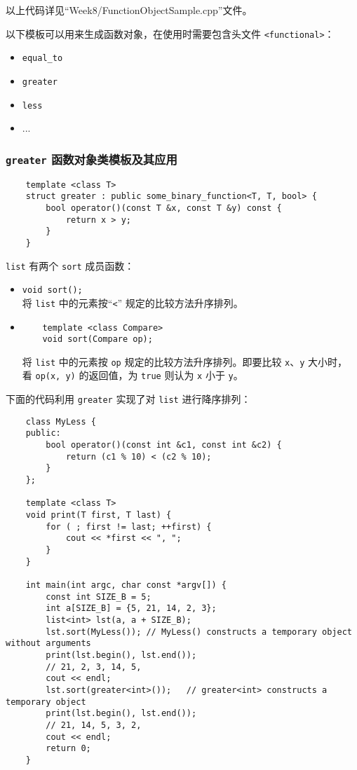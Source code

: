 \documentclass[UTF8]{ctexart}
\begin{document}
以上代码详见``Week8/FunctionObjectSample.cpp''文件。

以下模板可以用来生成函数对象，在使用时需要包含头文件 \texttt{<functional>}：
\begin{itemize}
    \item \texttt{equal\_to}
    \item \texttt{greater}
    \item \texttt{less}
    \item ...
\end{itemize}

\subsubsection{\texttt{greater} 函数对象类模板及其应用}
\begin{verbatim}
    template <class T>
    struct greater : public some_binary_function<T, T, bool> {
        bool operator()(const T &x, const T &y) const {
            return x > y;
        }
    }
\end{verbatim}

\texttt{list} 有两个 \texttt{sort} 成员函数：
\begin{itemize}
    \item \texttt{void sort();} \\
    将 \texttt{list} 中的元素按“\texttt{<}” 规定的比较方法升序排列。
    \item
    \begin{verbatim}
    template <class Compare>
    void sort(Compare op);
    \end{verbatim}
    将 \texttt{list} 中的元素按 \texttt{op} 规定的比较方法升序排列。即要比较 \texttt{x}、\texttt{y} 大小时，
    看 \texttt{op(x, y)} 的返回值，为 \texttt{true} 则认为 \texttt{x} 小于 \texttt{y}。
\end{itemize}

下面的代码利用 \texttt{greater} 实现了对 \texttt{list} 进行降序排列：
\begin{verbatim}
    class MyLess {
    public:
        bool operator()(const int &c1, const int &c2) {
            return (c1 % 10) < (c2 % 10);
        }
    };

    template <class T>
    void print(T first, T last) {
        for ( ; first != last; ++first) {
            cout << *first << ", ";
        }
    }

    int main(int argc, char const *argv[]) {
        const int SIZE_B = 5;
        int a[SIZE_B] = {5, 21, 14, 2, 3};
        list<int> lst(a, a + SIZE_B);
        lst.sort(MyLess()); // MyLess() constructs a temporary object without arguments
        print(lst.begin(), lst.end());
        // 21, 2, 3, 14, 5,
        cout << endl;
        lst.sort(greater<int>());   // greater<int> constructs a temporary object
        print(lst.begin(), lst.end());
        // 21, 14, 5, 3, 2,
        cout << endl;
        return 0;
    }
\end{verbatim}
\end{document}
